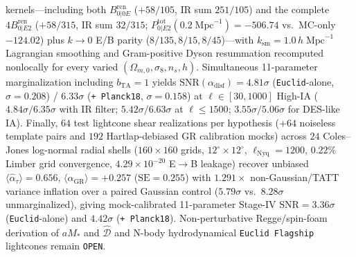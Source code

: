 \documentclass[11pt,a4paper]{article}
\begin{document}
\begin{enumerate}
kernels---including both $B_{0|0E}^{\mathrm{ren}}$ ($+58/105$, IR sum $251/105$) and the complete $4 B_{0|E2}^{\mathrm{ren}}$ ($+58/315$, IR sum $32/315$; $P_{0|E2}^{\mathrm{tot}}(0.2\;\mathrm{Mpc}^{-1}) = -506.74$ vs.\ MC-only $-124.02$) plus $k\to 0$ E/B parity ($8/135, 8/15, 8/45$)---with $k_{\mathrm{sm}} = 1.0\,h\;\mathrm{Mpc}^{-1}$ Lagrangian smoothing and Gram-positive Dyson resummation recomputed nonlocally for every varied $(\Omega_{m,0},\sigma_8,n_s,h)$. Simultaneous 11-parameter marginalization including $b_{\mathrm{TA}} = 1$ yields $\mathrm{SNR}(\alpha_{\mathrm{disf}}) = 4.81\sigma$ (\texttt{Euclid}-alone, $\sigma = 0.208$) / $6.33\sigma$ (\texttt{+ Planck18}, $\sigma = 0.158$) at $\ell\in[30,1000]$ High-IA ($4.84\sigma / 6.35\sigma$ with IR filter; $5.42\sigma / 6.63\sigma$ at $\ell\le 1500$; $3.55\sigma / 5.06\sigma$ for DES-like IA). Finally, $64$ test lightcone shear realizations per hypothesis (+$64$ noiseless template pairs and $192$ Hartlap-debiased GR calibration mocks) across $24$ Coles--Jones \cite{ColesJones1991} log-normal radial shells ($160\times 160$ grids, $12^\circ\times 12^\circ$, $\ell_{\mathrm{Nyq}}=1200$, $0.22\%$ Limber grid convergence, $4.29\times 10^{-20}$ E$\to$B leakage) recover unbiased $\langle\hat{\alpha}_\tau\rangle = 0.656$, $\langle\hat{\alpha}_{\mathrm{GR}}\rangle = +0.257$ ($\mathrm{SE}=0.255$) with $1.291\times$ non-Gaussian/TATT variance inflation over a paired Gaussian control ($5.79\sigma$ vs.\ $8.28\sigma$ unmarginalized), giving mock-calibrated 11-parameter Stage-IV $\mathrm{SNR} = 3.36\sigma$ (\texttt{Euclid}-alone) and $4.42\sigma$ (\texttt{+ Planck18}). Non-perturbative Regge/spin-foam derivation of $a M_*$ and $\hat{\mathcal{D}}$ and N-body hydrodynamical \texttt{Euclid Flagship} lightcones remain \texttt{OPEN}.
\end{enumerate}
\end{document}
